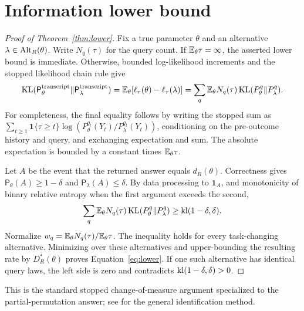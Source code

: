 \section{Information lower bound}\label{app:lower}
\begin{proof}[Proof of Theorem~\ref{thm:lower}]
Fix a true parameter $\theta$ and an alternative $\lambda\in\operatorname{Alt}_R(\theta)$. Write $N_q(\tau)$ for the query count. If $\mathbb E_\theta\tau=\infty$, the asserted lower bound is immediate. Otherwise, bounded log-likelihood increments and the stopped likelihood chain rule give
\begin{equation}
\operatorname{KL}(\mathsf P_\theta^{\rm transcript}\Vert\mathsf P_\lambda^{\rm transcript})
=\mathbb E_\theta\!\left[\ell_\tau(\theta)-\ell_\tau(\lambda)\right]
=\sum_q\mathbb E_\theta N_q(\tau)\operatorname{KL}(P_\theta^q\Vert P_\lambda^q). \label{eq:stoppedkl}
\end{equation}
For completeness, the final equality follows by writing the stopped sum as $\sum_{t\ge1}\mathbf1\{\tau\ge t\}\log(P_\theta^{q_t}(Y_t)/P_\lambda^{q_t}(Y_t))$, conditioning on the pre-outcome history and query, and exchanging expectation and sum. The absolute expectation is bounded by a constant times $\mathbb E_\theta\tau$.

Let $A$ be the event that the returned answer equals $d_R(\theta)$. Correctness gives $\mathsf P_\theta(A)\ge1-\delta$ and $\mathsf P_\lambda(A)\le\delta$. By data processing to $\mathbf1_A$, and monotonicity of binary relative entropy when the first argument exceeds the second,
\begin{equation}
\sum_q\mathbb E_\theta N_q(\tau)\operatorname{KL}(P_\theta^q\Vert P_\lambda^q)
\ge\operatorname{kl}(1-\delta,\delta).
\end{equation}
Normalize $w_q=\mathbb E_\theta N_q(\tau)/\mathbb E_\theta\tau$. The inequality holds for every task-changing alternative. Minimizing over these alternatives and upper-bounding the resulting rate by $D_R^*(\theta)$ proves Equation~\eqref{eq:lower}. If one such alternative has identical query laws, the left side is zero and contradicts $\operatorname{kl}(1-\delta,\delta)>0$.
\end{proof}
This is the standard stopped change-of-measure argument specialized to the partial-permutation answer; see \citet{kaufmann2016} for the general identification method.

